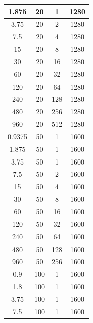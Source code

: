 \documentclass[a4paper, 12pt]{article}
\begin{document}
\begin{longtable}[c]{|c|c|c|c|}
1.875      & 20              & 1              & 1280    \\ \hline
3.75       & 20              & 2              & 1280    \\ \hline
7.5        & 20              & 4              & 1280    \\ \hline
15         & 20              & 8              & 1280    \\ \hline
30         & 20              & 16             & 1280    \\ \hline
60         & 20              & 32             & 1280    \\ \hline
120        & 20              & 64             & 1280    \\ \hline
240        & 20              & 128            & 1280    \\ \hline
480        & 20              & 256            & 1280    \\ \hline
960        & 20              & 512            & 1280    \\ \hline
0.9375     & 50              & 1              & 1600    \\ \hline
1.875      & 50              & 1              & 1600    \\ \hline
3.75       & 50              & 1              & 1600    \\ \hline
7.5        & 50              & 2              & 1600    \\ \hline
15         & 50              & 4              & 1600    \\ \hline
30         & 50              & 8              & 1600    \\ \hline
60         & 50              & 16             & 1600    \\ \hline
120        & 50              & 32             & 1600    \\ \hline
240        & 50              & 64             & 1600    \\ \hline
480        & 50              & 128            & 1600    \\ \hline
960        & 50              & 256            & 1600    \\ \hline
0.9        & 100             & 1              & 1600    \\ \hline
1.8        & 100             & 1              & 1600    \\ \hline
3.75       & 100             & 1              & 1600    \\ \hline
7.5        & 100             & 1              & 1600    \\ \hline

\end{longtable}
\end{document}
